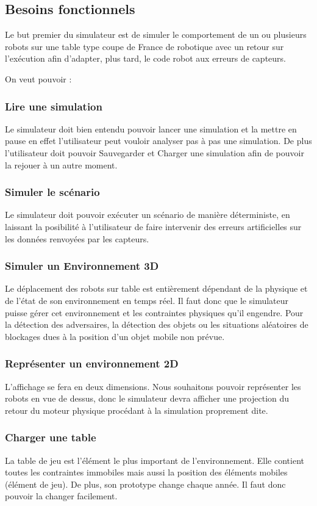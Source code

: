 
\subsection{Besoins fonctionnels}

Le but premier du simulateur est de simuler le comportement de un ou plusieurs robots sur une table type coupe de France de robotique avec un retour sur l'exécution afin d'adapter, plus tard, le code robot aux erreurs de capteurs.

On veut pouvoir :
\subsubsection{Lire une simulation}
Le simulateur doit bien entendu pouvoir lancer une simulation et la mettre en pause en effet l'utilisateur peut vouloir analyser pas à pas une simulation. De plus l'utilisateur doit pouvoir Sauvegarder et Charger une simulation afin de pouvoir la rejouer à un autre moment.

\subsubsection{Simuler le scénario}
Le simulateur doit pouvoir exécuter un scénario de manière déterministe, en laissant la posibilité à l'utilisateur de faire intervenir des erreurs artificielles sur les données renvoyées par les capteurs.

\subsubsection{Simuler un Environnement 3D}
Le déplacement des robots sur table est entièrement dépendant de la physique et de l'état de son environnement en temps réel. Il faut donc que le simulateur puisse gérer cet environnement et les contraintes physiques qu'il engendre. Pour la détection des adversaires, la détection des objets ou les situations aléatoires de blockages dues à la position d'un objet mobile non prévue. 

\subsubsection{Représenter un environnement 2D}
L'affichage se fera en deux dimensions. Nous souhaitons pouvoir représenter les robots en vue de dessus, donc le simulateur devra afficher une projection du retour du moteur physique procédant à la simulation proprement dite. 

\subsubsection{Charger une table}
La table de jeu est l'élément le plus important de l'environnement. Elle contient toutes les contraintes immobiles mais aussi la position des éléments mobiles (élément de jeu). De plus, son prototype change chaque année. Il faut donc pouvoir la changer facilement.

